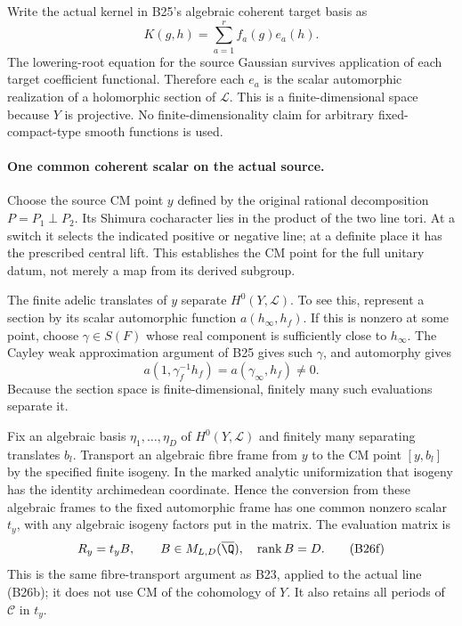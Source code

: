 Write the actual kernel in B25's algebraic coherent target
basis as
\[
                  K(g,h)=\sum_{a=1}^r f_a(g)e_a(h).
 \tag{B26d}
\]
The lowering-root equation for the source Gaussian survives
application of each target coefficient functional.  Therefore
each $e_a$ is the scalar automorphic realization of a
holomorphic section of $\mathscr L$.  This is a finite-dimensional
space because $Y$ is projective.  No finite-dimensionality
claim for arbitrary fixed-compact-type smooth functions is used.

\paragraph{One common coherent scalar on the actual source.}
Choose the source CM point $y$ defined by the original rational
decomposition $P=P_1\perp P_2$.  Its Shimura cocharacter lies
in the product of the two line tori.  At a switch it selects
the indicated positive or negative line; at a definite place
it has the prescribed central lift.  This establishes the CM
point for the full unitary datum, not merely a map from its
derived subgroup.

The finite adelic translates of $y$ separate
$H^0(Y,\mathscr L)$.  To see this, represent a section by its
scalar automorphic function $a(h_\infty,h_f)$.  If this is
nonzero at some point, choose $\gamma\in S(F)$ whose real
component is sufficiently close to $h_\infty$.  The Cayley
weak approximation argument of B25 gives such $\gamma$, and
automorphy gives
\[
       a(1,\gamma_f^{-1}h_f)=a(\gamma_\infty,h_f)\ne0.
 \tag{B26e}
\]
Because the section space is finite-dimensional, finitely
many such evaluations separate it.

Fix an algebraic basis $\eta_1,\ldots,\eta_D$ of
$H^0(Y,\mathscr L)$ and finitely many separating translates
$b_l$.  Transport an algebraic fibre frame from $y$ to the
CM point $[y,b_l]$ by the specified finite isogeny.  In the
marked analytic uniformization that isogeny has the identity
archimedean coordinate.  Hence the conversion from these
algebraic frames to the fixed automorphic frame has one
common nonzero scalar $t_y$, with any algebraic isogeny
factors put in the matrix.  The evaluation matrix is
\[
                   R_y=t_y B,
           \qquad B\in M_{L,D}(\overline\Q),\quad
                       \operatorname{rank}B=D.
 \tag{B26f}
\]
This is the same fibre-transport argument as B23, applied to
the actual line (B26b); it does not use CM of the cohomology
of $Y$.  It also retains all periods of $\mathscr C$ in $t_y$.

